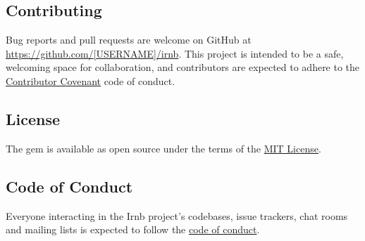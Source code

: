 \documentclass{jsarticle}
\begin{document}
\subsection{Contributing}
\label{sec-5-4}

Bug reports and pull requests are welcome on GitHub at
\url{https://github.com/[USERNAME]/irnb}. This project is intended to be a
safe, welcoming space for collaboration, and contributors are expected
to adhere to the \href{http://contributor-covenant.org}{Contributor
Covenant} code of conduct.

\subsection{License}
\label{sec-5-5}

The gem is available as open source under the terms of the
\href{https://opensource.org/licenses/MIT}{MIT License}.

\subsection{Code of Conduct}
\label{sec-5-6}

Everyone interacting in the Irnb project's codebases, issue trackers,
chat rooms and mailing lists is expected to follow the
\href{https://github.com/\%5BUSERNAME\%5D/irnb/blob/master/CODE_OF_CONDUCT.md}{code
of conduct}.
\end{document}
